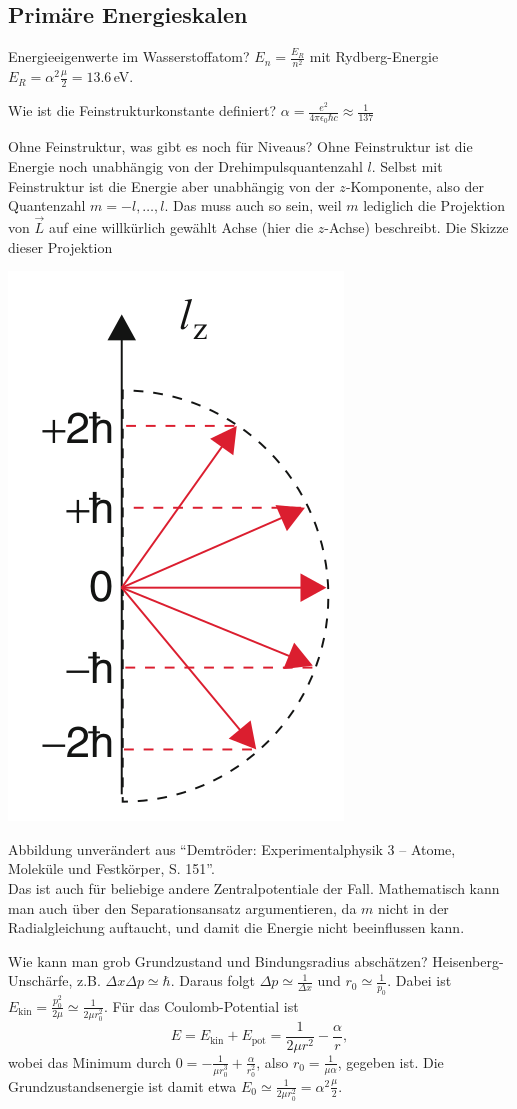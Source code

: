 \subsection{Primäre Energieskalen}

\begin{fquestion}{Energieeigenwerte im Wasserstoffatom?}
    $E_n = \frac{E_R}{n^2}$ mit Rydberg-Energie $E_R = \alpha^2  \frac{\mu}{2} = 13.6\,$eV.
\end{fquestion}

\begin{fquestion}{Wie ist die Feinstrukturkonstante definiert? }
    $\alpha = \frac{e^2}{4\pi\epsilon_0\hbar c} \approx \frac{1}{137}$
\end{fquestion}

\begin{fquestion}{Ohne Feinstruktur, was gibt es noch für Niveaus?}
    Ohne Feinstruktur ist die Energie noch unabhängig von der Drehimpulsquantenzahl $l$.
    Selbst mit Feinstruktur ist die Energie aber unabhängig von der $z$-Komponente, also der Quantenzahl $m = -l, \dots , l$.
    Das muss auch so sein, weil $m$ lediglich die Projektion von $\Vec{L}$ auf eine willkürlich gewählt Achse (hier die $z$-Achse) beschreibt.
    Die Skizze dieser Projektion 
    \begin{center}
        \includegraphics[width=0.25\linewidth]{img/Projektion_Magnetquantenzahl.png}
    \end{center}
    Abbildung unverändert aus ``Demtröder: Experimentalphysik 3 -- Atome, Moleküle und Festkörper, S. 151''. 
    \\
    Das ist auch für beliebige andere Zentralpotentiale der Fall.
    Mathematisch kann man auch über den Separationsansatz argumentieren, da $m$ nicht in der Radialgleichung auftaucht, und damit die Energie nicht beeinflussen kann.
\end{fquestion}

\begin{fquestion}{Wie kann man grob Grundzustand und Bindungsradius abschätzen?}
    Heisenberg-Unschärfe, z.B. $\Delta x \Delta p \simeq \hbar$.
    Daraus folgt $\Delta p \simeq \frac{1}{\Delta x}$ und $r_0 \simeq \frac{1}{p_0}$.
    Dabei ist $E_\text{kin} = \frac{p_0^2}{2\mu} \simeq \frac{1}{2\mu r_0^2}$.
    Für das Coulomb-Potential ist
    $$E = E_\text{kin} + E_\text{pot} = \frac{1}{2\mu r^2} - \frac{\alpha}{r},$$
    wobei das Minimum durch $0 = -\frac{1}{\mu r_0^3} + \frac{\alpha}{r_0^2}$, also $r_0 = \frac{1}{\mu\alpha} $, gegeben ist.
    Die Grundzustandsenergie ist damit etwa $E_0 \simeq \frac{1}{2\mu r_0^2} = \alpha^2\frac{\mu }{2}$.
\end{fquestion}

